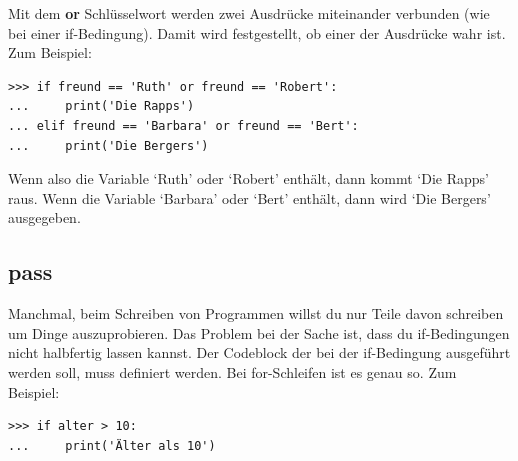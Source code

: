 Mit dem \textbf{or} Schlüsselwort werden zwei Ausdrücke miteinander verbunden (wie bei einer if-Bedingung). Damit wird festgestellt, ob einer der Ausdrücke wahr ist. Zum Beispiel:

\begin{Verbatim}[frame=single]
>>> if freund == 'Ruth' or freund == 'Robert':
...     print('Die Rapps')
... elif freund == 'Barbara' or freund == 'Bert':
...     print('Die Bergers')
\end{Verbatim}

Wenn also die Variable  `Ruth' oder `Robert' enthält, dann kommt `Die Rapps' raus. Wenn die Variable `Barbara' oder `Bert' enthält, dann wird `Die Bergers' ausgegeben.

\subsection*{pass}

Manchmal, beim Schreiben von Programmen willst du nur Teile davon schreiben um Dinge auszuprobieren. Das Problem bei der Sache ist, dass du if-Bedingungen nicht halbfertig lassen kannst. Der Codeblock der bei der if-Bedingung ausgeführt werden soll, muss definiert werden. Bei for-Schleifen ist es genau so. Zum Beispiel: 

\begin{Verbatim}[frame=single]
>>> if alter > 10:
...     print('Älter als 10')
\end{Verbatim}

